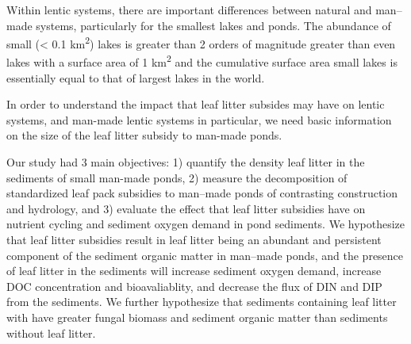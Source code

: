 Within lentic systems, there are important differences between natural and man--made systems, particularly for the smallest lakes and ponds. The abundance of small (< 0.1 km\textsuperscript{2}) lakes is greater than 2 orders of magnitude greater than even lakes with a surface area of 1 km\textsuperscript{2} \cite{Downing_2010} and the cumulative surface area small lakes is essentially equal to that of largest lakes in the world.  

In order to understand the impact that leaf litter subsides may have on lentic systems, and man-made lentic systems in particular, we need basic information on the size of the leaf litter subsidy to man-made ponds.


Our study had 3 main objectives: 1) quantify the density leaf litter in the sediments of small man-made ponds, 2) measure the decomposition of standardized leaf pack subsidies to man--made ponds of contrasting construction and hydrology, and 3) evaluate the effect that leaf litter subsidies have on nutrient cycling and sediment oxygen demand in pond sediments. We hypothesize that leaf litter subsidies result in leaf litter being an abundant and persistent component of the sediment organic matter in man--made ponds, and the presence of leaf litter in the sediments will increase sediment oxygen demand, increase DOC concentration and bioavaliablity, and decrease the flux of DIN and DIP from the sediments. We further hypothesize that sediments containing leaf litter with have greater fungal biomass and sediment organic matter than sediments without leaf litter.